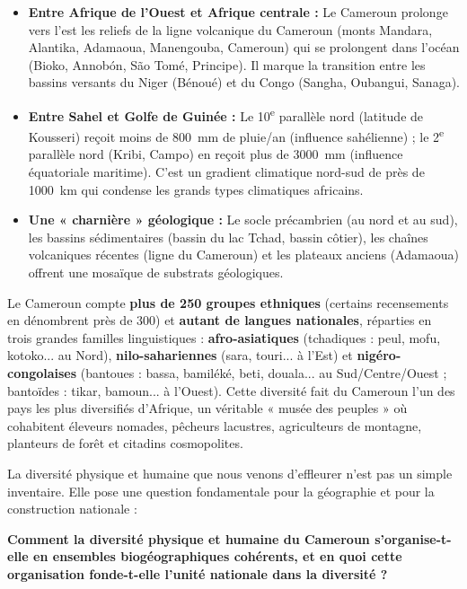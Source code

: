 \documentclass[11pt]{article}
\newcommand{\cle}[1]{{\popxbold\color{popdark}#1}}
\newcounter{popsec}
\newcounter{popsub}
\newcommand{\courssub}[1]{%
  \stepcounter{popsub}%
  \par\vspace{9pt}\noindent{\popxbold\fontsize{11.5}{13}\selectfont\color{popink}{\color{poporange}\thepopsec.\thepopsub}\hspace{6pt}#1}\par\nopagebreak\vspace{4pt}
}
\begin{document}
\begin{itemize}
    \item \textbf{Entre Afrique de l'Ouest et Afrique centrale :} Le Cameroun prolonge vers l'est les reliefs de la ligne volcanique du Cameroun (monts Mandara, Alantika, Adamaoua, Manengouba, Cameroun) qui se prolongent dans l'océan (Bioko, Annobón, São Tomé, Principe). Il marque la transition entre les bassins versants du Niger (Bénoué) et du Congo (Sangha, Oubangui, Sanaga).
    \item \textbf{Entre Sahel et Golfe de Guinée :} Le 10\textsuperscript{e} parallèle nord (latitude de Kousseri) reçoit moins de \SI{800}{mm} de pluie/an (influence sahélienne) ; le 2\textsuperscript{e} parallèle nord (Kribi, Campo) en reçoit plus de \SI{3000}{mm} (influence équatoriale maritime). C'est un \cle{gradient climatique nord-sud} de près de \SI{1000}{km} qui condense les grands types climatiques africains.
    \item \textbf{Une « charnière » géologique :} Le socle précambrien (au nord et au sud), les bassins sédimentaires (bassin du lac Tchad, bassin côtier), les chaînes volcaniques récentes (ligne du Cameroun) et les plateaux anciens (Adamaoua) offrent une mosaïque de substrats géologiques.
\end{itemize}

\begin{savaistu}
Le Cameroun compte \textbf{plus de 250 groupes ethniques} (certains recensements en dénombrent près de 300) et \textbf{autant de langues nationales}, réparties en trois grandes familles linguistiques : \textbf{afro-asiatiques} (tchadiques : peul, mofu, kotoko... au Nord), \textbf{nilo-sahariennes} (sara, touri... à l'Est) et \textbf{nigéro-congolaises} (bantoues : bassa, bamiléké, beti, douala... au Sud/Centre/Ouest ; bantoïdes : tikar, bamoun... à l'Ouest). Cette diversité fait du Cameroun l'un des pays les plus diversifiés d'Afrique, un véritable « musée des peuples » où cohabitent éleveurs nomades, pêcheurs lacustres, agriculteurs de montagne, planteurs de forêt et citadins cosmopolites.
\end{savaistu}

\courssub{Problématique et annonce du plan}

La diversité physique et humaine que nous venons d'effleurer n'est pas un simple inventaire. Elle pose une question fondamentale pour la géographie et pour la construction nationale :

\begin{aretenir}
\textbf{Comment la diversité physique et humaine du Cameroun s'organise-t-elle en \cle{ensembles biogéographiques} cohérents, et en quoi cette organisation fonde-t-elle l'unité nationale dans la diversité ?}
\end{aretenir}
\end{document}
